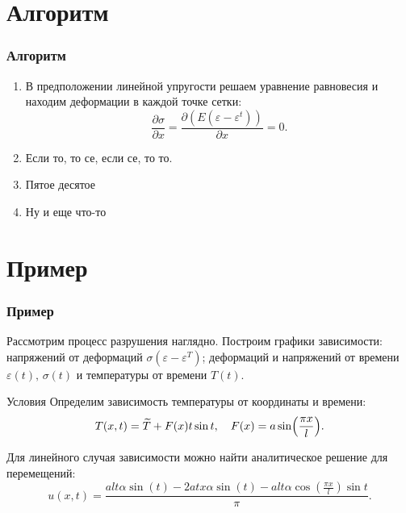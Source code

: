 \documentclass[unicode]{beamer}
\begin{document}
    \section{Алгоритм}
    \begin{frame}
        \frametitle{Алгоритм}
            \begin{enumerate}
                \item В предположении линейной упругости решаем уравнение равновесия и находим деформации в каждой точке сетки:
                \[
                    \dfrac{\partial \sigma}{\partial x} = \dfrac{\partial (E (\varepsilon - \varepsilon^t))}{\partial x} = 0.
                \]
                \item Если то, то се, если се, то то.
                \item Пятое десятое
                \item Ну и еще что-то
            \end{enumerate}
    \end{frame}

    \section{Пример}
    \begin{frame}
        \frametitle{Пример}
        Рассмотрим процесс разрушения наглядно. Построим графики зависимости: напряжений от деформаций $\sigma(\varepsilon - \varepsilon^T)$; деформаций и напряжений от времени $\varepsilon(t), \, \sigma(t)$ и температуры от времени $T(t)$.

        \vspace{0.7em}

        \begin{block}{Условия}
            Определим зависимость температуры от координаты и времени:
            \[
                T(x, t) = \widetilde{T} + F(x) t \sin t, \quad F(x) = a \sin \Bigl( \dfrac{\pi x}{l} \Bigr). 
            \]

            Для линейного случая зависимости можно найти аналитическое решение для перемещений:
            \[
                u(x, t) = \dfrac{a l t \alpha \sin(t) - 2 a t x \alpha \sin(t) - a l t \alpha \cos (\tfrac{\pi x}{l}) \sin t}{\pi}.
            \]
        \end{block}
    \end{frame}
\end{document}
